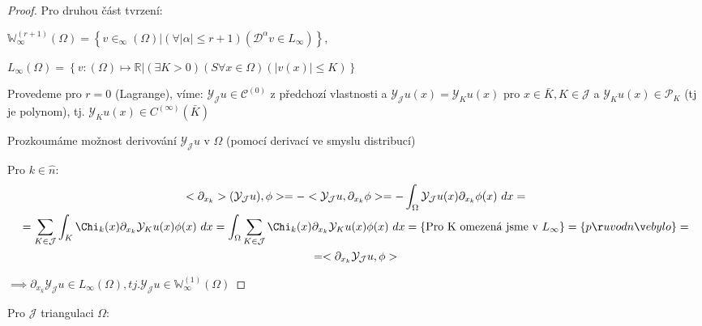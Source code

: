 \documentclass[../main.tex]{subfiles}
\begin{document}

\begin{proof}

    Pro druhou část tvrzení:

    $\mathbb{W}_\infty^{(r+1)}(\Omega) = \left\{v\in _\infty(\Omega)| (\forall |\alpha|\leq r+1)(\mathcal{D}^\alpha v \in L_\infty)\right\}$,

    $L_\infty(\Omega) = \left\{v: (\Omega)\mapsto \mathbb{R}| (\exists K > 0)(S\forall x \in \Omega)(|v(x)| \leq K) \right\} $

    Provedeme pro $r = 0$ (Lagrange), víme: $\mathcal{Y}_\mathcal{J} u \in \mathcal{C}^{(0)}$ z předchozí vlastnosti a $\mathcal{Y}_\mathcal{J} u (x) = \mathcal{Y}_K u(x)$ pro $x\in\bar{K}, K \in \mathcal{J}$  a $\mathcal{Y}_K u(x)\in \mathcal{P}_K$ (tj je polynom), tj. $\mathcal{Y}_K u(x)\in C^{(\infty)}(\bar{K})$

    Prozkoumáme možnost derivování $\mathcal{Y}_\mathcal{J} u$ v $\Omega$ (pomocí derivací ve smyslu  distribucí)

    Pro $k\in\hat{n}:$ 
    \begin{multline}
    <\partial_{x_k}>(\mathcal{Y}_\mathcal{J} u), \phi> = - <\mathcal{Y}_\mathcal{J} u, \partial_{x_k} \phi> = - \int_\Omega \mathcal{Y}_\mathcal{J} u(x) \partial_{x_k}\phi(x) \ dx =\\
    = \sum_{K\in\mathcal{J} }\int_K \Chi_{k} (x) \partial_{x_k} \mathcal{Y}_K u(x) \phi(x) \ dx = \int_\Omega\sum_{K\in\mathcal{J} } \Chi_{k} (x) \partial_{x_k} \mathcal{Y}_K u(x) \phi(x) \ dx = \left\{\text{Pro K omezená jsme v }L_\infty\right\} = \left\{ původně bylo \right\} =\\
    = <\partial_{x_k}\mathcal{Y}_\mathcal{J} u, \phi >
    \end{multline}


    $\implies \partial_{x_k} \mathcal{Y}_\mathcal{J} u \in L_\infty(\Omega), tj. \mathcal{Y}_\mathcal{J} u \in \mathbb{W}_\infty^{(1)}(\Omega)$

\end{proof}


\begin{remark}
    Pro $\mathcal{J}$ triangulaci $\Omega $:
\end{remark}
\end{document}
